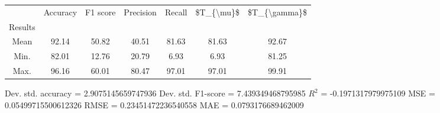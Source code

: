 \begin{tabular}{|c|c|c|c|c|c|c|}
\toprule
{} &  Accuracy &  F1 score &  Precision &  Recall &  \$T\_\{\textbackslash mu\}\$ &  \$T\_\{\textbackslash gamma\}\$ \\
Results &           &           &            &         &            &               \\
\hline
Mean    &     92.14 &     50.82 &      40.51 &   81.63 &      81.63 &         92.67 \\
Min.    &     82.01 &     12.76 &      20.79 &    6.93 &       6.93 &         81.25 \\
Max.    &     96.16 &     60.01 &      80.47 &   97.01 &      97.01 &         99.91 \\
\bottomrule
\end{tabular}

 Dev. std. accuracy = 2.9075145659747936
 Dev. std. F1-score = 7.439349468795985
 $R^2$ = -0.1971317979975109
 MSE = 0.05499715500612326
 RMSE = 0.23451472236540558
 MAE = 0.0793176689462009